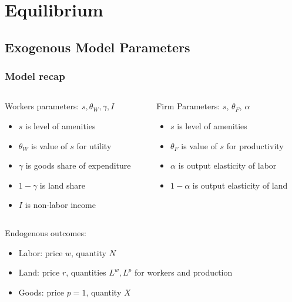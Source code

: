 \documentclass[11pt,notes=hide,aspectratio=169]{beamer}
\begin{document}
\section{Equilibrium}
\subsection{Exogenous Model Parameters}
\begin{frame}
\frametitle{Model recap}
\begin{columns}
\begin{column}{0.49\textwidth}
Workers parameters: $s,\theta_W, \gamma, I$
\begin{itemize}
\item $s$ is level of amenities
\item $\theta_W$ is value of $s$ for utility
\item $\gamma$ is goods share of expenditure
\item $1-\gamma$ is land share
\item $I$ is non-labor income
\end{itemize}
\end{column}
\begin{column}{0.49\textwidth}
Firm Parameters: $s$, ${\theta_F}$, $\alpha$ 
\begin{itemize}
\item $s$ is level of amenities
\item $\theta_F$ is value of $s$ for productivity
\item $\alpha$ is output elasticity of labor
\item $1-\alpha$ is output elasticity of land
\end{itemize}
\vfill
\end{column}
\end{columns}
\begin{center}
Endogenous outcomes:
\begin{itemize}
\item Labor: price $w$, quantity $N$
\item Land: price $r$, quantities $L^w, L^p$ for workers and production
\item Goods: price $p=1$, quantity $X$ 
\end{itemize}
\end{center}
\end{frame}
\end{document}
